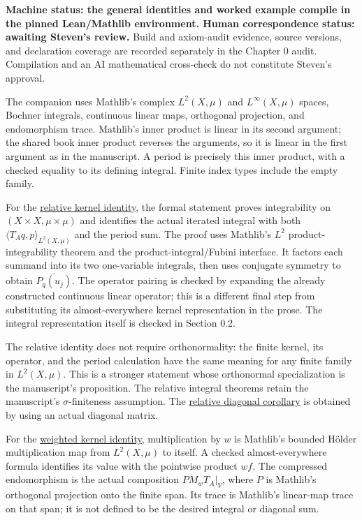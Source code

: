 \textbf{Machine status: the general identities and worked example compile in the pinned Lean/Mathlib environment. Human correspondence status: awaiting Steven's review.} Build and axiom-audit evidence, source versions, and declaration coverage are recorded separately in the Chapter 0 audit. Compilation and an AI mathematical cross-check do not constitute Steven's approval.

The companion uses Mathlib's complex $L^2(X,\mu)$ and $L^\infty(X,\mu)$ spaces, Bochner integrals, continuous linear maps, orthogonal projection, and endomorphism trace. Mathlib's inner product is linear in its second argument; the shared book inner product reverses the arguments, so it is linear in the first argument as in the manuscript. A period is precisely this inner product, with a checked equality to its defining integral. Finite index types include the empty family.

For the \hyperref[finite-relative-kernel-identity]{relative kernel identity}, the formal statement proves integrability on $(X\times X,\mu\times\mu)$ and identifies the actual iterated integral with both $\langle T_Aq,p\rangle_{L^2(X,\mu)}$ and the period sum. The proof uses Mathlib's $L^2$ product-integrability theorem and the product-integral/Fubini interface. It factors each summand into its two one-variable integrals, then uses conjugate symmetry to obtain $\overline{P_q(u_j)}$. The operator pairing is checked by expanding the already constructed continuous linear operator; this is a different final step from substituting its almost-everywhere kernel representation in the prose. The integral representation itself is checked in Section 0.2.

The relative identity does not require orthonormality: the finite kernel, its operator, and the period calculation have the same meaning for any finite family in $L^2(X,\mu)$. This is a stronger statement whose orthonormal specialization is the manuscript's proposition. The relative integral theorems retain the manuscript's $\sigma$-finiteness assumption. The \hyperref[finite-relative-diagonal-identity]{relative diagonal corollary} is obtained by using an actual diagonal matrix.

For the \hyperref[finite-weighted-kernel-identity]{weighted kernel identity}, multiplication by $w$ is Mathlib's bounded H\"older multiplication map from $L^2(X,\mu)$ to itself. A checked almost-everywhere formula identifies its value with the pointwise product $wf$. The compressed endomorphism is the actual composition $P M_wT_A|_V$, where $P$ is Mathlib's orthogonal projection onto the finite span. Its trace is Mathlib's linear-map trace on that span; it is not defined to be the desired integral or diagonal sum.

